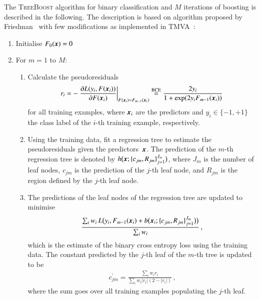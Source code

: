 The \textsc{TreeBoost} algorithm for binary classification and $M$ iterations of
boosting is described in the following. The description is based on algorithm
proposed by Friedman~\cite{Friedman:2001wbq} with few modifications as
implemented in TMVA~\cite{TMVA}:
\begin{enumerate}
  \setlength{\itemsep}{0pt}

\item Initialise $F_0(\myvec{x}) = 0$

\item For $m = 1$ to $M$:
  \begin{enumerate}
    \setlength{\itemsep}{0pt}

  \item Calculate the pseudoresiduals
    \begin{align*}
      r_i
      = - \left. \frac{\partial L(y_i, F(\myvec{x}_i))}{\partial F(\myvec{x}_i)}\right|_{F(\myvec{x}_i) = F_{m - 1}(\myvec{x}_i)}
      \overset{\text{BCE}}{=} \frac{2 y_i}{1 + \exp(2 y_i F_{m-1}(\myvec{x}_i))}
    \end{align*}
    for all training examples, where $\myvec{x}_i$ are the predictors and
    $y_i \in \{ -1, +1 \}$ the class label of the $i$-th training example,
    respectively.

  \item Using the training data, fit a regression tree to estimate the
    pseudoresiduals given the predictors~$\myvec{x}$. The prediction of the
    $m$-th regression tree is denoted by
    $h\bigl( \myvec{x}; \{c_{jm}, R_{jm}\}_{j=1}^{J_{m}} \bigr)$, where $J_{m}$
    is the number of leaf nodes, $c_{jm}$ is the prediction of the $j$-th leaf
    node, and $R_{jm}$ is the region defined by the $j$-th leaf node.

  \item The predictions of the leaf nodes of the regression tree are updated to
    minimise
    \begin{align*}
      \frac{
      \sum_i w_i \, L\bigl( y_i, F_{m - 1}(\myvec{x}_i)
      + b\bigl(\myvec{x}_i; \{c_{jm}, R_{jm}\}_{j=1}^{J_{m}}\bigr) \bigr)
      }{
      \sum_i w_i
      } \,\text{,}
    \end{align*}
    which is the estimate of the binary cross entropy loss using the training
    data. The constant predicted by the $j$-th leaf of the $m$-th tree is
    updated to be
    \begin{align*}
      c_{jm}^\prime = \frac{ \sum_i w_i r_i }{ \sum_i w_i |r_i| (2 - |r_i|)} \,\text{,}
    \end{align*}
    where the sum goes over all training examples populating the $j$-th leaf.


\end{enumerate}
\end{enumerate}
